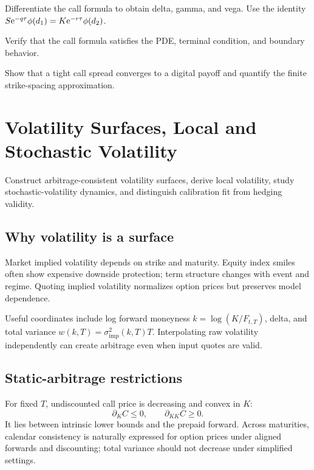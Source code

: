 \begin{exercise}
Differentiate the call formula to obtain delta, gamma, and vega. Use the identity
$S\mathrm e^{-q\tau}\phi(d_1)=K\mathrm e^{-r\tau}\phi(d_2)$.
\end{exercise}
\begin{exercise}
Verify that the call formula satisfies the PDE, terminal condition, and boundary
behavior.
\end{exercise}
\begin{exercise}
Show that a tight call spread converges to a digital payoff and quantify the finite
strike-spacing approximation.
\end{exercise}


\chapter{Volatility Surfaces, Local and Stochastic Volatility}

\begin{objectives}
Construct arbitrage-consistent volatility surfaces, derive local volatility, study
stochastic-volatility dynamics, and distinguish calibration fit from hedging validity.
\end{objectives}

\section{Why volatility is a surface}

Market implied volatility depends on strike and maturity. Equity index smiles often
show expensive downside protection; term structure changes with event and regime.
Quoting implied volatility normalizes option prices but preserves model dependence.

Useful coordinates include log forward moneyness
$k=\log(K/F_{t,T})$, delta, and total variance
$w(k,T)=\sigma_{\mathrm{imp}}^2(k,T)T$. Interpolating raw volatility independently
can create arbitrage even when input quotes are valid.

\section{Static-arbitrage restrictions}

For fixed $T$, undiscounted call price is decreasing and convex in $K$:
\[
\partial_K C\leq0,\qquad \partial_{KK}C\geq0.
\]
It lies between intrinsic lower bounds and the prepaid forward. Across maturities,
calendar consistency is naturally expressed for option prices under aligned forwards
and discounting; total variance should not decrease under simplified settings.

